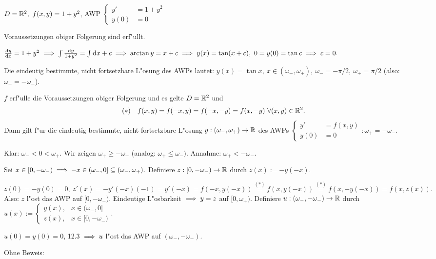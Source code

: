 \documentclass[a4paper,twoside,DIV15,BCOR12mm]{scrbook}
\begin{document}
\begin{beispiele}
\item $D=\mathbb{R}^2,\ f(x,y) = 1+y^2$, AWP $\begin{cases} y' & = 1+y^2 \\ y(0) & =0 \end{cases}$

Voraussetzungen obiger Folgerung sind erf"ullt.

$\frac{\mathrm{d} y}{\mathrm{d} x} = 1+y^2 \implies \int \frac{\mathrm{d} y}{1+y^2} = \int \mathrm{d} x + c \implies \arctan y = x+c \implies y(x) = \tan (x+c),\ 0=y(0) = \tan c \implies c=0.$

Die eindeutig bestimmte, nicht fortsetzbare L"osung des AWPs lautet: $y(x) = \tan x,\ x \in (\omega_-,\omega_+),\ \omega_- = -\pi/2,\ \omega_+ = \pi/2$ (also: $\omega_+ = -\omega_-$).

\item $f$ erf"ulle die Voraussetzungen obiger Folgerung und es gelte $D = \mathbb{R}^2$ und \[(*)\quad f(x,y) = f(-x,y) = f(-x,-y) = f(x,-y)\ \forall (x,y) \in \MdR^2.\] Dann gilt f"ur die eindeutig bestimmte, nicht fortsetzbare L"osung $y:(\omega_-,\omega_+) \to \mathbb{R}$ des AWPs $\begin{cases} y' &=f(x,y)\\ y(0) &=0 \end{cases}: \omega_+ = -\omega_-$.

\begin{beweis}
Klar: $\omega_-<0<\omega_+$. Wir zeigen $\omega_+\ge-\omega_-$ (analog: $\omega_+ \le \omega_-).$ Annahme: $\omega_+<-\omega_-$.

Sei $x\in[0,-\omega_-) \implies -x \in (\omega_-,0] \subseteq (\omega_-,\omega_+).$ Definiere $z:[0,-\omega_-)\to\mathbb{R}$ durch $z(x):=-y(-x).$

$z(0) = -y(0) = 0,\ z'(x) = -y'(-x)(-1) = y'(-x) = f(-x,y(-x)) \overset{(*)}{=} f(x,y(-x)) \overset{(*)}{=} f(x,-y(-x)) = f(x,z(x)).$ Also: $z$ l"ost das AWP auf $[0,-\omega_-).$ Eindeutige L"osbarkeit $\implies y=z$ auf $[0,\omega_+)$. Definiere $u:(\omega_-,-\omega_-) \to \mathbb{R}$ durch $u(x):=\begin{cases} y(x), & x\in (\omega_-,0]\\ z(x), & x\in[0,-\omega_-) \end{cases}.$

$u(0) = y(0) = 0$, 12.3 $\implies u$ l"ost das AWP auf $(\omega_-,-\omega_-)$.
\end{beweis}
\end{beispiele}

Ohne Beweis:
\end{document}

